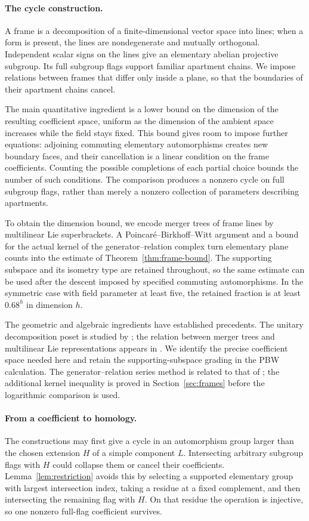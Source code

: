\paragraph{The cycle construction.}
A frame is a decomposition of a finite-dimensional vector space into
lines; when a form is present, the lines are nondegenerate and mutually
orthogonal. Independent scalar signs on the lines give an elementary
abelian projective subgroup. Its full subgroup flags support familiar
apartment chains. We impose relations between frames that differ only
inside a plane, so that the boundaries of their apartment chains cancel.

The main quantitative ingredient is a lower bound on the dimension of
the resulting coefficient space, uniform as the dimension of the
ambient space increases while the field stays fixed. This bound gives
room to impose further equations: adjoining commuting elementary
automorphisms creates new boundary faces, and their cancellation is a
linear condition on the frame coefficients. Counting the possible
completions of each partial choice bounds the number of such conditions.
The comparison produces a nonzero cycle on full subgroup flags, rather
than merely a nonzero collection of parameters describing apartments.

To obtain the dimension bound, we encode merger trees of frame lines
by multilinear Lie superbrackets. A Poincar\'e--Birkhoff--Witt argument
and a bound for the actual kernel of the generator--relation complex
turn elementary plane counts into the estimate of
Theorem~\ref{thm:frame-bound}. The supporting subspace and its isometry
type are retained throughout, so the same estimate can be used after
the descent imposed by specified commuting automorphisms.
In the symmetric case with field parameter at least five, the retained
fraction is at least $0.68^h$ in dimension $h$.

The geometric and algebraic ingredients have established precedents.
The unitary decomposition poset is studied by
\citet{PitermanWelker2024}; the relation between merger trees and
multilinear Lie representations appears in
\citet{Stanley1982,Robinson2004}. We identify the precise coefficient
space needed here and retain the supporting-subspace grading in the
PBW calculation. The generator--relation series method is related to
that of \citet{GolodShafarevich1964}; the additional kernel inequality
is proved in Section~\ref{sec:frames} before the logarithmic comparison
is used.

\paragraph{From a coefficient to homology.}
The constructions may first give a cycle in an automorphism group
larger than the chosen extension $H$ of a simple component $L$. Intersecting
arbitrary subgroup flags with $H$ could collapse them or cancel their
coefficients. Lemma~\ref{lem:restriction} avoids this by selecting a
supported elementary group with largest intersection index, taking a
residue at a fixed complement, and then intersecting the remaining
flag with $H$. On that residue the operation is injective, so one
nonzero full-flag coefficient survives.

